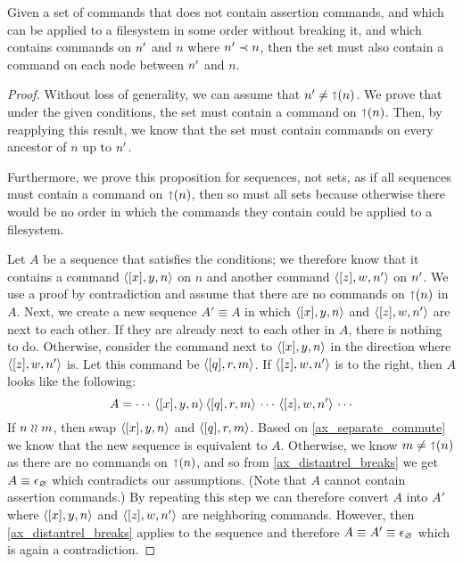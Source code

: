 \begin{mylem}
Given a set of commands that
does not contain assertion commands,
and which can be applied to a filesystem in some order without breaking it,
and which contains commands on $n'$ and $n$ where $n'\prec n$,
then the set must also contain a command
on each node between $n'$ and $n$.
\end{mylem}
\begin{proof}
Without loss of generality, we can assume that $n'\neq\mathord{\shortuparrow}(n)$.
We prove that under the given conditions, the set must contain a command on $\mathord{\shortuparrow}(n)$.
Then, by reapplying this result, we know that the set must contain commands on every
ancestor of $n$ up to $n'$.

Furthermore,
we prove this proposition for sequences, not sets, as if all sequences must contain a command on $\mathord{\shortuparrow}(n)$,
then so must all sets because otherwise there would be no order in which the commands they contain could be
applied to a filesystem.

Let $A$ be a sequence that satisfies the conditions;
we therefore know that it contains a command $\langle{[x],y,n}\rangle$ on $n$
and another command $\langle{[z],w,n'}\rangle$ on $n'$.
We use a proof by contradiction and assume that there are no commands on $\mathord{\shortuparrow}(n)$ in $A$.
Next, we create a new sequence $A'\equiv A$ in which $\langle{[x],y,n}\rangle$ and $\langle{[z],w,n'}\rangle$ are next to each other.
If they are already next to each other in $A$, there is nothing to do.
Otherwise, consider the command next to $\langle{[x],y,n}\rangle$ in the direction where $\langle{[z],w,n'}\rangle$ is.
Let this command be $\langle{[q],r,m}\rangle$.
If $\langle{[z],w,n'}\rangle$ is to the right, then $A$ looks like the following:
\[ A = \cdots\,\langle{[x],y,n}\rangle\,\langle{[q],r,m}\rangle\,\cdots\,\langle{[z],w,n'}\rangle\,\cdots \]
If $n\mathrel{\wr\wr} m$, then swap $\langle{[x],y,n}\rangle$ and $\langle{[q],r,m}\rangle$. Based on \cref{ax_separate_commute} we know that the new
sequence is equivalent to $A$.
Otherwise, we know $m\neq\mathord{\shortuparrow}(n)$ as there are no commands on $\mathord{\shortuparrow}(n)$, and so
from \cref{ax_distantrel_breaks} we get $A\equiv\epsilon_\varnothing$ which contradicts our assumptions.
(Note that $A$ cannot contain assertion commands.)
By repeating this step we can therefore convert $A$ into $A'$ where $\langle{[x],y,n}\rangle$ and $\langle{[z],w,n'}\rangle$ are neighboring commands.
However, then \cref{ax_distantrel_breaks} applies to the sequence and therefore $A\equiv A'\equiv\epsilon_\varnothing$ which
is again a contradiction.
\end{proof}


